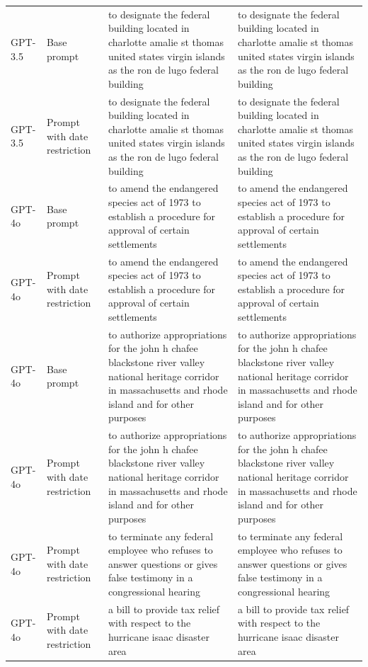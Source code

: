 \begin{longtable}{>{\raggedright\arraybackslash}p{1.4cm}>{\raggedright\arraybackslash}p{1.4cm}>{\raggedright\arraybackslash}p{5.5cm}>{\raggedright\arraybackslash}p{5.5cm}}
GPT-3.5 & Base prompt & to designate the federal building located in charlotte amalie st thomas united states virgin islands as the ron de lugo federal building & to designate the federal building located in charlotte amalie st thomas united states virgin islands as the ron de lugo federal building\\
GPT-3.5 & Prompt with date restriction & to designate the federal building located in charlotte amalie st thomas united states virgin islands as the ron de lugo federal building & to designate the federal building located in charlotte amalie st thomas united states virgin islands as the ron de lugo federal building\\
GPT-4o & Base prompt & to amend the endangered species act of 1973 to establish a procedure for approval of certain settlements & to amend the endangered species act of 1973 to establish a procedure for approval of certain settlements\\
GPT-4o & Prompt with date restriction & to amend the endangered species act of 1973 to establish a procedure for approval of certain settlements & to amend the endangered species act of 1973 to establish a procedure for approval of certain settlements\\
GPT-4o & Base prompt & to authorize appropriations for the john h chafee blackstone river valley national heritage corridor in massachusetts and rhode island and for other purposes & to authorize appropriations for the john h chafee blackstone river valley national heritage corridor in massachusetts and rhode island and for other purposes\\
GPT-4o & Prompt with date restriction & to authorize appropriations for the john h chafee blackstone river valley national heritage corridor in massachusetts and rhode island and for other purposes & to authorize appropriations for the john h chafee blackstone river valley national heritage corridor in massachusetts and rhode island and for other purposes\\
GPT-4o & Prompt with date restriction & to terminate any federal employee who refuses to answer questions or gives false testimony in a congressional hearing & to terminate any federal employee who refuses to answer questions or gives false testimony in a congressional hearing\\
GPT-4o & Prompt with date restriction & a bill to provide tax relief with respect to the hurricane isaac disaster area & a bill to provide tax relief with respect to the hurricane isaac disaster area\\

\end{longtable}
